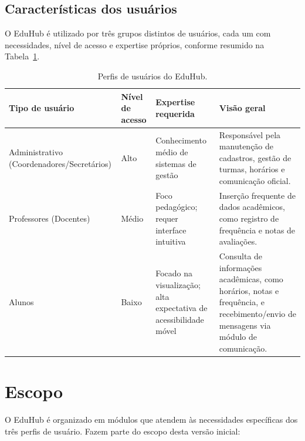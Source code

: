 \subsection{Características dos usuários}

O EduHub é utilizado por três grupos distintos de usuários, cada um com
necessidades, nível de acesso e expertise próprios, conforme resumido na
Tabela~\ref{tab:perfis-usuarios}.

\begin{table}[ht]
\centering
\caption{Perfis de usuários do EduHub.}
\label{tab:perfis-usuarios}
\begin{tabularx}{\textwidth}{p{} p{} p{} X}
\toprule
\textbf{Tipo de usuário} & \textbf{Nível de acesso} & \textbf{Expertise requerida} & \textbf{Visão geral} \\
\midrule
Administrativo (Coordenadores/Secretários) & Alto & Conhecimento médio de sistemas de gestão & Responsável pela manutenção de cadastros, gestão de turmas, horários e comunicação oficial. \\
Professores (Docentes) & Médio & Foco pedagógico; requer interface intuitiva & Inserção frequente de dados acadêmicos, como registro de frequência e notas de avaliações. \\
Alunos & Baixo & Focado na visualização; alta expectativa de acessibilidade móvel & Consulta de informações acadêmicas, como horários, notas e frequência, e recebimento/envio de mensagens via módulo de comunicação. \\
\bottomrule
\end{tabularx}
\end{table}

\section{Escopo}

O EduHub é organizado em módulos que atendem às necessidades específicas dos
três perfis de usuário. Fazem parte do escopo desta versão inicial:

